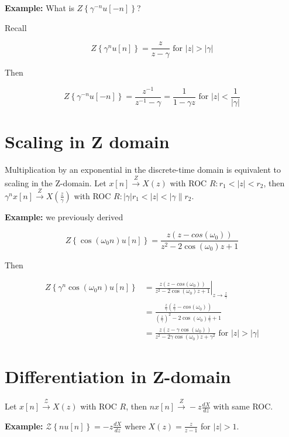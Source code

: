 \documentclass{article}
\begin{document}
\textbf{Example:} What is $Z\left\{ \gamma^{-n} u[-n] \right\}$?

Recall

\[
	Z\left\{ \gamma^{n} u[n] \right\} = \frac{z}{z-\gamma} \mbox{ for } |z| > |\gamma|
\]

Then

\[
	Z\left\{ \gamma^{-n} u[-n] \right\} = \frac{z^{-1}}{z^{-1}-\gamma} = \frac{1}{1-\gamma z} \mbox{ for } |z| < \frac{1}{|\gamma|}
\]

\section{Scaling in Z domain}

Multiplication by an exponential in the discrete-time domain is equivalent to scaling in the Z-domain. Let $x[n] \stackrel{Z}{\longrightarrow} X(z)$ with ROC $R: r_1 < |z| < r_2$, then $\gamma^n x[n] \stackrel{Z}{\longrightarrow} X\left(\frac{z}{\gamma}\right)$ with ROC $R: |\gamma|r_1 < |z| < |\gamma\|r_2$.

\textbf{Example:} we previously derived

\[
	Z\left\{ \cos(\omega_0 n) u[n]\right\} = \frac{z\left(z-cos(\omega_0)\right)}{z^2 - 2\cos(\omega_0)z + 1}
\]

Then

\begin{align*}
	Z\left\{ \gamma^n \cos(\omega_0 n) u[n]\right\} & = \left. \frac{z\left(z-cos(\omega_0)\right)}{z^2 - 2\cos(\omega_0)z + 1} \right|_{z\rightarrow \frac{z}{\gamma}}                           \\
	                                                & = \frac{\frac{z}{\gamma}\left(\frac{z}{\gamma}-cos(\omega_0)\right)}{\left(\frac{z}{\gamma}\right)^2 - 2\cos(\omega_0)\frac{z}{\gamma} + 1} \\
	                                                & = \frac{z\left(z-\gamma\cos(\omega_0)\right)}{z^2 - 2\gamma\cos(\omega_0)z + \gamma^2} \mbox{ for } |z| > |\gamma|
\end{align*}

\section{Differentiation in Z-domain}

Let $x[n] \stackrel{\mathcal{Z}}{\longrightarrow} X(z)$ with ROC $R$, then $nx[n] \stackrel{Z}{\longrightarrow} -z \frac{dX}{dz}$ with same ROC.

\textbf{Example:} $\mathcal{Z}\left\{nu[n]\right\} = -z \frac{dX}{dz}$
where $X(z) = \frac{z}{z-1}$ for $|z| >1$.
\end{document}
